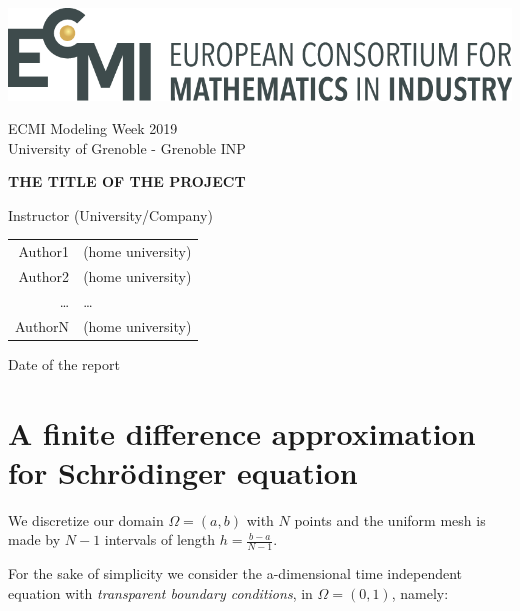 \documentclass[a4paper,oneside]{book}
\theoremstyle{definition}
\theoremstyle{plain}
\begin{document}
\includegraphics[scale=0.4]{ecmi-logo}

ECMI Modeling Week 2019\\
University of Grenoble - Grenoble INP

\begin{center}
\vspace{2.0cm}
{\Large{\textbf{THE TITLE OF THE PROJECT}}}


Instructor (University/Company)

\begin{tabular}{rl}
Author1 & (home university) \\
Author2 & (home university) \\
\ldots & \ldots \\
AuthorN & (home university)
\end{tabular}


Date of the report
\end{center}



\newpage

\tableofcontents


\newpage







\chapter{A finite difference approximation for Schr{\"o}dinger equation}


We discretize our domain $\Omega=(a,b)$ with $N$ points and the uniform mesh is made by $N-1$ intervals of length $h=\frac{b-a}{N-1}$.

For the sake of simplicity we consider the a-dimensional time independent equation with \emph{transparent boundary conditions}, in $\Omega=(0,1)$, namely:
\end{document}
